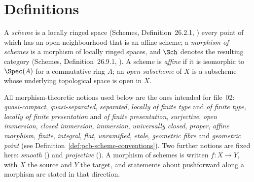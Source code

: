 \section{Definitions}\label{sec:defs}

\begin{definition}[Schemes]\label{def:pc-scheme}
A \emph{scheme} is a locally ringed space (Schemes,
Definition~26.2.1, ) every point of which has an
open neighbourhood that is an affine scheme; a \emph{morphism of
schemes} is a morphism of locally ringed spaces, and $\Sch$ denotes the
resulting category (Schemes, Definition~26.9.1, ).
A scheme is \emph{affine} if it is isomorphic to
$\Spec(A)$ for a commutative ring $A$; an \emph{open subscheme} of $X$
is a subscheme whose underlying topological space is open in $X$.
\mathlibok\ 
\end{definition}

\begin{definition}
\label{def:pc-morphism-conventions}
All morphism-theoretic notions used below are the ones intended for
file~02: \emph{quasi-compact}, \emph{quasi-separated},
\emph{separated}, \emph{locally of finite type} and \emph{of finite
type}, \emph{locally of finite presentation} and \emph{of finite
presentation}, \emph{surjective}, \emph{open immersion},
\emph{closed immersion}, \emph{immersion}, \emph{universally closed},
\emph{proper}, \emph{affine morphism}, \emph{finite}, \emph{integral},
\emph{flat}, \emph{unramified}, \emph{etale}, \emph{geometric fibre} and
\emph{geometric point} (see
Definition~\ref{def:pcb-scheme-conventions}).
Two further notions are fixed here: \emph{smooth}
() and \emph{projective}
().
A morphism of schemes is written $f:X\to Y$, with $X$ the source and $Y$
the target, and statements about pushforward along a morphism are stated
in that direction.
\end{definition}

